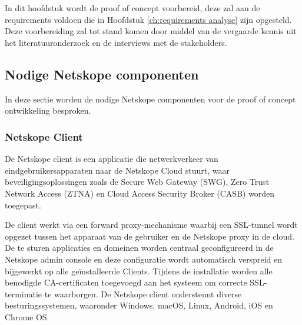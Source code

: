 
\chapter{}%
\label{ch:proof of concept preparation}

In dit hoofdstuk wordt de proof of concept voorbereid, deze zal aan de requirements voldoen die in Hoofdstuk \ref{ch:requirements analyse} zijn opgesteld. Deze voorbereiding zal tot stand komen door middel van de vergaarde kennis uit het literatuuronderzoek en de interviews met de stakeholders.

\section{Nodige Netskope componenten}

In deze sectie worden de nodige Netskope componenten voor de proof of concept ontwikkeling besproken.

\subsection{Netskope Client}
De Netskope client is een applicatie die netwerkverkeer van eindgebruikersapparaten naar de Netskope Cloud stuurt, waar beveiligingsoplossingen zoals de Secure Web Gateway (SWG), Zero Trust Network Access (ZTNA) en Cloud Access Security Broker (CASB) worden toegepast. 

\vspace{2ex}

De client werkt via een forward proxy-mechanisme waarbij een SSL-tunnel wordt opgezet tussen het apparaat van de gebruiker en de Netskope proxy in de cloud. De te sturen applicaties en domeinen worden centraal geconfigureerd in de Netskope admin console en deze configuratie wordt automatisch verspreid en bijgewerkt op alle geïnstalleerde Clients. Tijdens de installatie worden alle benodigde CA-certificaten toegevoegd aan het systeem om correcte SSL-terminatie te waarborgen.
De Netskope client ondersteunt diverse besturingssystemen, waaronder Windows, macOS, Linux, Android, iOS en Chrome OS.

\vspace{2ex}

